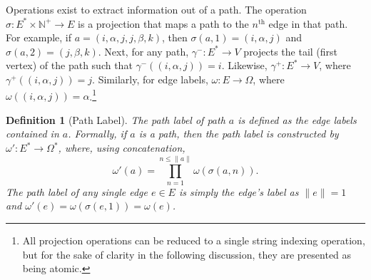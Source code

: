 \documentclass[10pt,conference,letterpaper]{IEEEtran}
\newcommand{\rar}{\rightarrow}
\newcommand{\mbb}{\mathbb}
\newtheorem{definition}{Definition}
\begin{document}
Operations exist to extract information out of a path. The operation $\sigma: E^* \times \mbb{N}^+ \rar E$ is a projection that maps a path to the $n^\text{th}$ edge in that path. For example, if $a = (i,\alpha,j,j,\beta,k)$, then $\sigma(a,1) = (i,\alpha,j)$ and $\sigma(a,2) = (j,\beta,k)$. Next, for any path, $\gamma^-: E^* \rar V$ projects the tail (first vertex) of the path such that $\gamma^-((i,\alpha,j)) = i$. Likewise, $\gamma^+: E^* \rar V$, where $\gamma^+((i,\alpha,j)) = j$. Similarly, for edge labels, $\omega: E \rar \Omega$, where $\omega((i,\alpha,j)) = \alpha$.\footnote{All projection operations can be reduced to a single string indexing operation, but for the sake of clarity in the following discussion, they are presented as being atomic.}
\begin{definition}[Path Label]
The \textit{path label} of path $a$ is defined as the edge labels contained in $a$. Formally, if $a$ is a path, then the path label is constructed by $\omega': E^* \rar \Omega^*$, where, using concatenation,
\begin{equation*}
\omega'(a) = \prod_{n=1}^{n \leq \|a\|} \omega\left(\sigma\left(a,n\right)\right).
\end{equation*}
The path label of any single edge $e \in E$ is simply the edge's label as $\|e\| = 1$ and $\omega'(e) = \omega(\sigma(e,1)) = \omega(e)$.
\end{definition}
\end{document}
